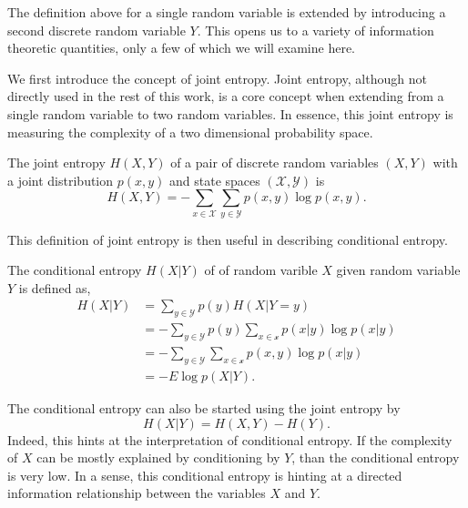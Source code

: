 The definition above for a single random variable is extended by introducing a second discrete random variable $Y$. This opens us to a variety of information theoretic quantities, only a few of which we will examine here.

We first introduce the concept of joint entropy. Joint entropy, although not directly used in the rest of this work, is a core concept when extending from a single random variable to two random variables. In essence, this joint entropy is measuring the complexity of a two dimensional probability space.

\begin{definition}
	The joint entropy $H(X,Y)$ of a pair of discrete random variables $(X,Y)$ with a joint distribution $p(x,y)$ and state spaces $(\mathcal{X}, \mathcal{Y})$ is
	\begin{equation}\label{eq:jointentropy}
	H(X, Y)=-\sum_{x \in \mathcal{X}} \sum_{y \in \mathcal{Y}} p(x, y) \log p(x, y).
	\end{equation}
\end{definition}

This definition of joint entropy is then useful in describing conditional entropy.

\begin{definition}
	The conditional entropy $H(X|Y)$ of of random varible $X$ given random variable $Y$ is defined as, 
		\begin{align}
		H(X | Y)&=\sum_{y \in \mathcal{Y}} p(y) H(X |Y=y) \\
		&=-\sum_{y \in \mathcal{Y}} p(y) \sum_{x \in \mathcal{x}} p(x | y) \log p(x | y) \nonumber \\ 
		&=-\sum_{y \in \mathcal{Y}} \sum_{x \in \mathcal{x}} p(x, y) \log p(x | y) \nonumber \\ 
		&=-E \log p(X | Y).
		\end{align}
\end{definition}

The conditional entropy can also be started using the joint entropy by
\begin{equation}
H(X|Y) = H(X,Y) - H(Y).
\end{equation}
Indeed, this hints at the interpretation of conditional entropy. If the complexity of $X$ can be mostly explained by conditioning by $Y$, than the conditional entropy is very low. In a sense, this conditional entropy is hinting at a directed information relationship between the variables $X$ and $Y$.

